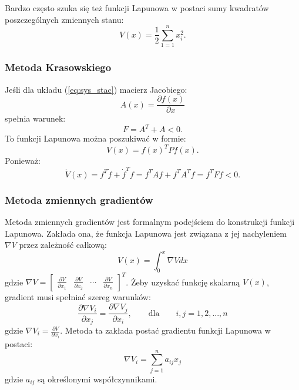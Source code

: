 \documentclass{article}
\begin{document}
        Bardzo często szuka się też funkcji Lapunowa w postaci sumy kwadratów poszczególnych zmiennych stanu:
        $$
            V(x) = \frac{1}{2}\sum_{1=1}^{n}{x_{i}^{2}}.
        $$

        \subsubsection{Metoda Krasowskiego}
        Jeśli dla układu (\ref{eq:sys_stac}) macierz Jacobiego:
        $$
            A(x) = \frac{\partial f(x)}{\partial x}
        $$
        spełnia warunek:
        $$
            F = A^{T} + A < 0.
        $$
        To funkcji Lapunowa można poszukiwać w formie:
        $$
            V(x) = f(x)^{T}Pf(x).
        $$
        Ponieważ:
        $$
            \dot{V}(x) = f^{T}\dot{f} + \dot{f}^{T}f = f^{T}Af + f^{T}A^{T}f = f^{T}Ff < 0.
        $$

        \subsubsection{Metoda zmiennych gradientów}
        Metoda zmiennych gradientów jest formalnym podejściem do konstrukcji funkcji Lapunowa.
        Zakłada ona, że funkcja Lapunowa jest związana z jej nachyleniem $\nabla V$ przez zależność całkową:
        \begin{equation}
            \label{eq:mzg_0}
            V(x) = \int_{0}^{x}{\nabla Vdx}
        \end{equation}
        gdzie $\nabla V = \begin{bmatrix} \frac{\partial V}{\partial x_{1}} & \frac{\partial V}{\partial x_{2}} & \cdots & \frac{\partial V}{\partial x_{n}}  \end{bmatrix}^{T}$.
        Żeby uzyskać funkcję skalarną $V(x)$, gradient musi spełniać szereg warunków:
        \begin{equation}
            \label{eq:mzg_1}
            \frac{\partial \nabla V_{i}}{\partial x_{j}} = \frac{\partial \nabla V_{j}}{\partial x_{i}}, \qquad \mathrm{dla} \qquad i,j=1, 2, ..., n
        \end{equation}
        gdzie $\nabla V_{i} = \frac{\partial V}{\partial x_{i}}$.
        Metoda ta zakłada postać gradientu funkcji Lapunowa w postaci:
        \begin{equation}
            \label{eq:mzg_2}
            \nabla V_{i} = \sum_{j=1}^{n}{a_{ij}x_{j}}
        \end{equation}
        gdzie $a_{ij}$ są określonymi współczynnikami.
\end{document}
